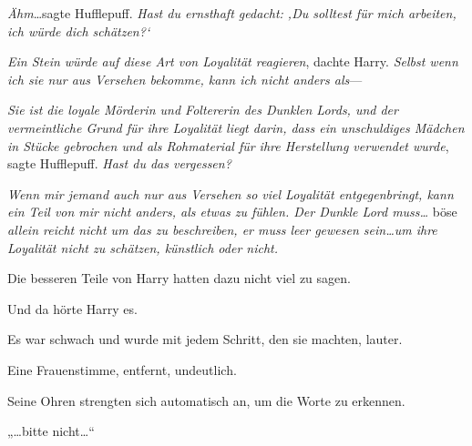\emph{Ähm}…sagte Hufflepuff. \emph{Hast du ernsthaft gedacht: ‚Du solltest für mich arbeiten, ich würde dich schätzen?‘}

\emph{Ein Stein würde auf diese Art von Loyalität reagieren}, dachte Harry. \emph{Selbst wenn ich sie nur aus Versehen bekomme, kann ich nicht anders als}—

\emph{Sie ist die loyale Mörderin und Foltererin des Dunklen Lords, und der vermeintliche Grund für ihre Loyalität liegt darin, dass ein unschuldiges Mädchen in Stücke gebrochen und als Rohmaterial für ihre Herstellung verwendet wurde}, sagte Hufflepuff. \emph{Hast du das vergessen?}

\emph{Wenn mir jemand auch nur aus Versehen so viel Loyalität entgegenbringt, kann ein Teil von mir nicht anders, als etwas zu fühlen. Der Dunkle Lord muss…} böse \emph{allein reicht nicht um das zu beschreiben, er muss leer gewesen sein…um ihre Loyalität nicht zu schätzen, künstlich oder nicht.}

Die besseren Teile von Harry hatten dazu nicht viel zu sagen.

Und da hörte Harry es.

Es war schwach und wurde mit jedem Schritt, den sie machten, lauter.

Eine Frauenstimme, entfernt, undeutlich.

Seine Ohren strengten sich automatisch an, um die Worte zu erkennen.

„…bitte nicht…“

